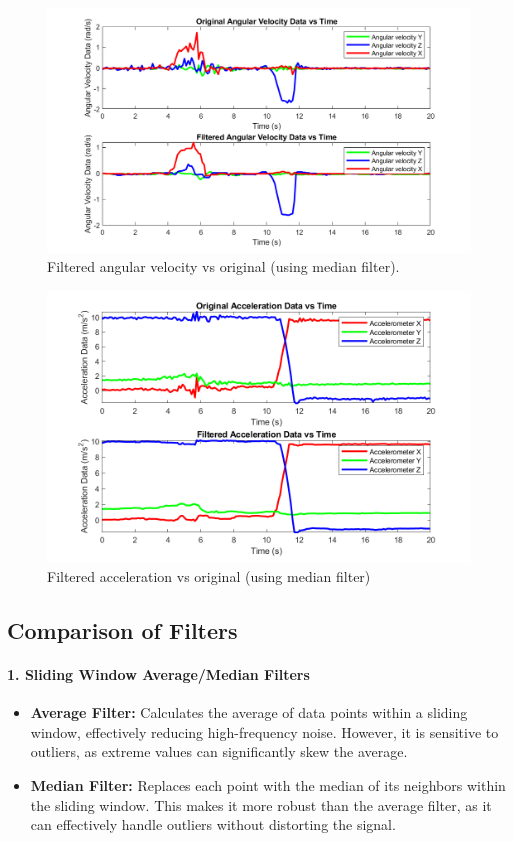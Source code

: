 \documentclass[12pt]{article}
\begin{document}
\begin{figure}[H]
    \centerline{\includegraphics[scale=0.8]{Imagens/filteredangularvsoriginal.png}}
    \caption{Filtered angular velocity vs original (using median filter).}
    \label{fig}
\end{figure}


\begin{figure}[H]
    \centerline{\includegraphics[scale=0.8]{Imagens/filteredaccelerationvsoriginal.png}}
    \caption{Filtered acceleration vs original (using median filter)}
    \label{fig}
\end{figure}


\subsection*{Comparison of Filters}

\paragraph{1. Sliding Window Average/Median Filters}
\begin{itemize}
    \item \textbf{Average Filter:} 
    Calculates the average of data points within a sliding window, effectively reducing high-frequency noise. However, it is sensitive to outliers, as extreme values can significantly skew the average.
    \item \textbf{Median Filter:} 
    Replaces each point with the median of its neighbors within the sliding window. This makes it more robust than the average filter, as it can effectively handle outliers without distorting the signal.
\end{itemize}
\end{document}
